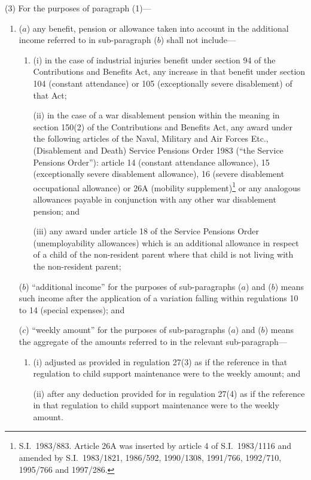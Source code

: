 \documentclass[12pt,a4paper]{article}
\begin{document}
(3) For the purposes of paragraph (1)—
\begin{enumerate}\item[]
($a$) any benefit, pension or allowance taken into account in the additional income referred to in sub-paragraph ($b$)  shall not include—
\begin{enumerate}\item[]
(i) in the case of industrial injuries benefit under section 94 of the Contributions and Benefits Act, any increase in that benefit under section 104 (constant attendance) or 105 (exceptionally severe disablement) of that Act;

(ii) in the case of a war disablement pension within the meaning in section 150(2) of the Contributions and Benefits Act, any award under the following articles of the Naval, Military and Air Forces Etc., (Disablement and Death) Service Pensions Order 1983 (“the Service Pensions Order”): article 14 (constant attendance allowance), 15 (exceptionally severe disablement allowance), 16 (severe disablement occupational allowance) or 26A (mobility supplement)\footnote{S.I.\ 1983/883. Article 26A was inserted by article 4 of S.I.\ 1983/1116 and amended by S.I.\ 1983/1821, 1986/592, 1990/1308, 1991/766, 1992/710, 1995/766 and 1997/286.} or any analogous allowances payable in conjunction with any other war disablement pension; and

(iii) any award under article 18 of the Service Pensions Order (unemployability allowances) which is an additional allowance in respect of a child of the non-resident parent where that child is not living with the non-resident parent;
\end{enumerate}

($b$) “additional income” for the purposes of sub-paragraphs ($a$)  and ($b$)  means such income after the application of a variation falling within regulations 10 to 14 (special expenses); and

($c$) “weekly amount” for the purposes of sub-paragraphs ($a$)  and ($b$)  means the aggregate of the amounts referred to in the relevant sub-paragraph—
\begin{enumerate}\item[]
(i) adjusted as provided in regulation 27(3) as if the reference in that regulation to child support maintenance were to the weekly amount; and

(ii) after any deduction provided for in regulation 27(4) as if the reference in that regulation to child support maintenance were to the weekly amount.
\end{enumerate}
\end{enumerate}
\end{document}

